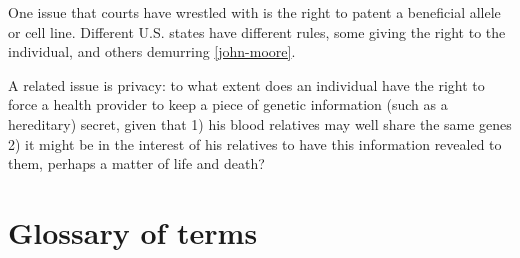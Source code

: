 \documentclass{article}
\begin{document}
One issue that courts have wrestled with is the right to patent a beneficial allele or cell line. Different U.S. states have different rules, some giving the right to the individual, and others demurring \ref{john-moore}.

A related issue is  privacy: to what extent does an individual have the right to force a health provider to keep a piece of genetic information (such as a hereditary) secret, given that 1) his blood relatives may well share the same genes 2) it might be in the interest of his relatives to have this information revealed to them, perhaps a matter of life and death?


\section{Glossary of terms}


\end{document}
